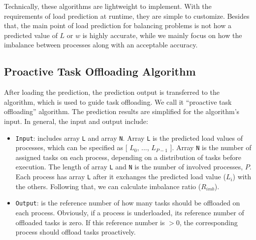 Technically, these algorithms are lightweight to implement. With the requirements of load prediction at runtime, they are simple to customize. Besides that, the main point of load prediction for balancing problems is not how a predicted value of $L$ or $w$ is highly accurate, while we mainly focus on how the imbalance between processes along with an acceptable accuracy.

\subsection{Proactive Task Offloading Algorithm} \label{subsec:proact-offload-algorithm}

After loading the prediction, the prediction output is transferred to the algorithm, which is used to guide task offloading. We call it ``proactive task offloading'' algorithm. The prediction results are simplified for the algorithm's input. In general, the input and output include:

\begin{itemize}
	\item \texttt{Input}: includes array \texttt{L} and array \texttt{N}. Array \texttt{L} is the predicted load values of processes, which can be specified as $[$ $L_{0}$, $...$, $L_{P-1}$ $]$. Array \texttt{N} is the number of assigned tasks on each process, depending on a distribution of tasks before execution. The length of array \texttt{L} and \texttt{N} is the number of involved processes, $P$. Each process has array \texttt{L} after it exchanges the predicted load value ($L_{i}$) with the others. Following that, we can calculate imbalance ratio ($R_{imb}$).
	
	\item \texttt{Output}: is the reference number of how many tasks should be offloaded on each process. Obviously, if a process is underloaded, its reference number of offloaded tasks is zero. If this reference number is $> 0$, the corresponding process should offload tasks proactively.
\end{itemize}


